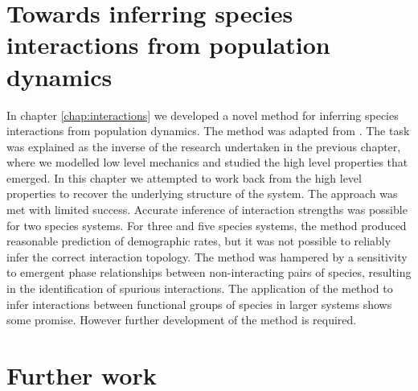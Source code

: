 \section{Towards inferring species interactions from population dynamics}
\label{sec:tisifpd}

In chapter \ref{chap:interactions} we developed a novel method for inferring species interactions from population dynamics. The method was adapted from \cite{shandilya2011inferring}. The task was explained as the inverse of the research undertaken in the previous chapter, where we modelled low level mechanics and studied the high level properties that emerged. In this chapter we attempted to work back from the high level properties to recover the underlying structure of the system. The approach was met with limited success. Accurate inference of interaction strengths was possible for two species systems. For three and five species systems, the method produced reasonable prediction of demographic rates, but it was not possible to reliably infer the correct interaction topology. The method was hampered by a sensitivity to emergent phase relationships between non-interacting pairs of species, resulting in the identification of spurious interactions. The application of the method to infer interactions between functional groups of species in larger systems shows some promise. However further development of the method is required. 


\section{Further work}
\label{sec:further_work}

